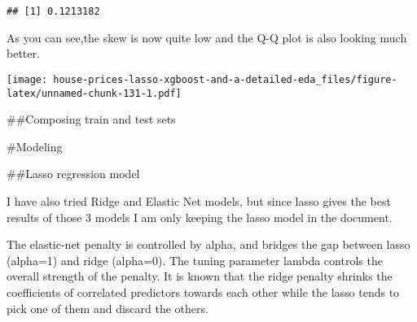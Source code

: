 \documentclass[]{article}
\newenvironment{Shaded}{\begin{snugshade}}{\end{snugshade}}
\newcommand{\CommentTok}[1]{\textcolor[rgb]{0.56,0.35,0.01}{\textit{#1}}}
\newcommand{\KeywordTok}[1]{\textcolor[rgb]{0.13,0.29,0.53}{\textbf{#1}}}
\newcommand{\NormalTok}[1]{#1}
\newcommand{\OperatorTok}[1]{\textcolor[rgb]{0.81,0.36,0.00}{\textbf{#1}}}
\newcommand{\StringTok}[1]{\textcolor[rgb]{0.31,0.60,0.02}{#1}}
\begin{document}
\begin{Shaded}
\end{Shaded}

\begin{verbatim}
## [1] 0.1213182
\end{verbatim}

As you can see,the skew is now quite low and the Q-Q plot is also
looking much better.

\begin{Shaded}
\end{Shaded}

\texttt{[image: house-prices-lasso-xgboost-and-a-detailed-eda\_files/figure-latex/unnamed-chunk-131-1.pdf]}

\#\#Composing train and test sets

\begin{Shaded}
\end{Shaded}

\#Modeling

\#\#Lasso regression model

I have also tried Ridge and Elastic Net models, but since lasso gives
the best results of those 3 models I am only keeping the lasso model in
the document.

The elastic-net penalty is controlled by alpha, and bridges the gap
between lasso (alpha=1) and ridge (alpha=0). The tuning parameter lambda
controls the overall strength of the penalty. It is known that the ridge
penalty shrinks the coefficients of correlated predictors towards each
other while the lasso tends to pick one of them and discard the others.
\end{document}
